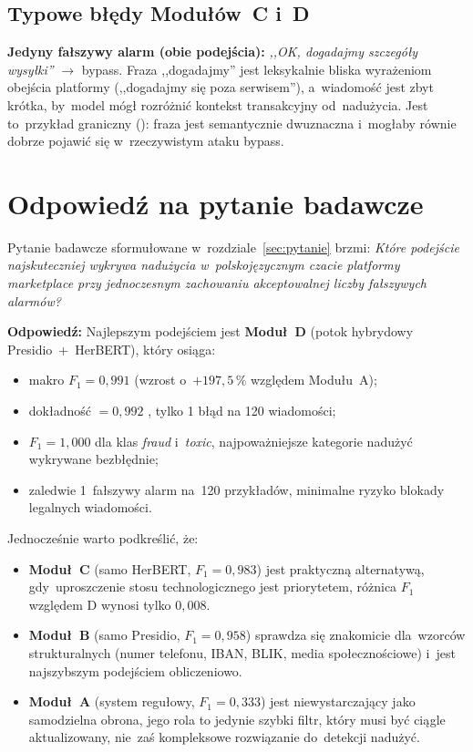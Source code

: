 \subsection{Typowe błędy Modułów~C i~D}

\textbf{Jedyny fałszywy alarm (obie podejścia):}
\textit{,,OK, dogadajmy szczegóły wysyłki''} $\to$ bypass.
Fraza ,,dogadajmy'' jest leksykalnie bliska wyrażeniom obejścia platformy
(,,dogadajmy się poza serwisem''), a~wiadomość jest zbyt krótka, by~model
mógł rozróżnić kontekst transakcyjny od~nadużycia.
Jest to~przykład graniczny (): fraza jest semantycznie
dwuznaczna i~mogłaby równie dobrze pojawić się w~rzeczywistym ataku bypass.

\section{Odpowiedź na pytanie badawcze}
\label{sec:odpowiedz}

Pytanie badawcze sformułowane w~rozdziale~\ref{sec:pytanie} brzmi:
\textit{Które podejście najskuteczniej wykrywa nadużycia w~polskojęzycznym
czacie platformy marketplace przy jednoczesnym zachowaniu akceptowalnej
liczby fałszywych alarmów?}

\medskip
\noindent \textbf{Odpowiedź:} Najlepszym podejściem jest \textbf{Moduł~D}
(potok hybrydowy Presidio~+~HerBERT), który osiąga:

\begin{itemize}
  \item makro $F_1 = 0{,}991$ (wzrost o~$+197{,}5\,\%$ względem Modułu~A);
  \item dokładność $= 0{,}992$ , tylko 1 błąd na 120 wiadomości;
  \item $F_1 = 1{,}000$ dla klas \textit{fraud} i~\textit{toxic},
    najpoważniejsze kategorie nadużyć wykrywane bezbłędnie;
  \item zaledwie 1~fałszywy alarm na~120 przykładów, minimalne ryzyko blokady
    legalnych wiadomości.
\end{itemize}

\noindent Jednocześnie warto podkreślić, że:
\begin{itemize}
  \item \textbf{Moduł~C} (samo HerBERT, $F_1 = 0{,}983$) jest praktyczną
    alternatywą, gdy~uproszczenie stosu technologicznego jest priorytetem, różnica $F_1$ względem D wynosi tylko $0{,}008$.
  \item \textbf{Moduł~B} (samo Presidio, $F_1 = 0{,}958$) sprawdza się znakomicie
    dla~wzorców strukturalnych (numer telefonu, IBAN, BLIK, media społecznościowe)
    i~jest najszybszym podejściem obliczeniowo.
  \item \textbf{Moduł~A} (system regułowy, $F_1 = 0{,}333$) jest niewystarczający
    jako samodzielna obrona, jego rola to jedynie szybki filtr, który musi być ciągle aktualizowany, nie~zaś kompleksowe rozwiązanie do~detekcji nadużyć.
\end{itemize}

